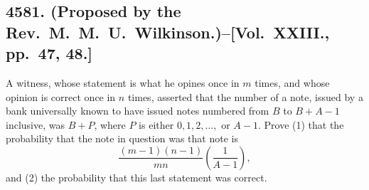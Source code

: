 \documentclass[11pt,a4paper]{book}
\begin{document}
\newpage

\subsection*{4581. (Proposed by the Rev.~M.~M.~U.~Wilkinson.)\---[Vol.~XXIII., pp.~47, 48.]}

A witness, whose statement is what he opines once in $m$ times, and whose opinion is correct once in $n$ times, asserted that the number of a note, issued by a bank universally known to have issued notes numbered from $B$ to $B+A-1$ inclusive, was $B+P$, where $P$ is either $0,1,2,\ldots,$ or $A-1$. Prove (1) that the probability that the note in question was that note is
\[
\frac{(m-1)(n-1)}{mn}\left(\frac{1}{A-1}\right),
\]
and (2) the probability that this last statement was correct.
\end{document}
